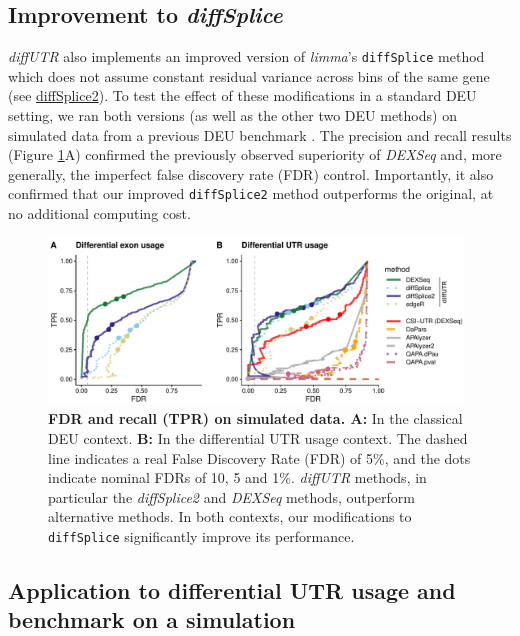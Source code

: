 \documentclass{bmcart}
\begin{document}
\subsection*{Improvement to \textit{diffSplice}}
\textit{diffUTR} also implements an improved version of \textit{limma}'s \texttt{diffSplice} method which does not assume constant residual variance across bins of the same gene (see \hyperref[sec:diffSplice2]{diffSplice2}). To test the effect of these modifications in a standard DEU setting, we ran both versions (as well as the other two DEU methods) on simulated data from a previous DEU benchmark \cite{Soneson2016IsoformUsage}. The precision and recall results (Figure \ref{fig:pr1}A) confirmed the previously observed superiority of \textit{DEXSeq} and, more generally, the imperfect false discovery rate (FDR) control. Importantly, it also confirmed that our improved \texttt{diffSplice2} method outperforms the original, at no additional computing cost.

\begin{figure}[h]
\includegraphics[width=0.98\textwidth]{figure2.pdf}
\caption{\textbf{FDR and recall (TPR) on simulated data. A:} In the classical DEU context. \textbf{B:} In the differential UTR usage context. The dashed line indicates a real False Discovery Rate (FDR) of 5\%, and the dots indicate nominal FDRs of 10, 5 and 1\%. \textit{diffUTR} methods, in particular the \textit{diffSplice2} and \textit{DEXSeq} methods, outperform alternative methods. In both contexts, our modifications to \texttt{diffSplice} significantly improve its performance.}
\label{fig:pr1}
\end{figure}

\subsection*{Application to differential UTR usage and benchmark on a simulation}
\end{document}
